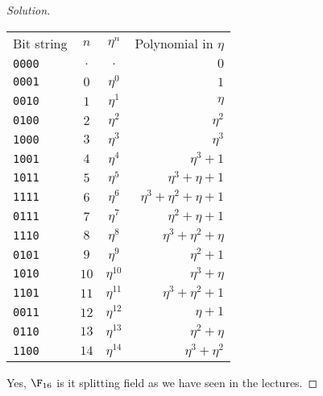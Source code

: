 \begin{proof}[Solution]
\begin{table}
\begin{tabular}{l|c|c|r}
Bit string & $n$ & $\eta^n$ & Polynomial in $\eta$\\
\texttt{0000} & $ .$ & $.        $ & $0$\\
\texttt{0001} & $ 0$ & $\eta^{ 0}$ & $1$\\
\texttt{0010} & $ 1$ & $\eta^{ 1}$ & $\eta$\\ 
\texttt{0100} & $ 2$ & $\eta^{ 2}$ & $\eta^2$\\
\texttt{1000} & $ 3$ & $\eta^{ 3}$ & $\eta^3$\\
\texttt{1001} & $ 4$ & $\eta^{ 4}$ & $\eta^3 + 1$\\
\texttt{1011} & $ 5$ & $\eta^{ 5}$ & $\eta^3 + \eta + 1$\\
\texttt{1111} & $ 6$ & $\eta^{ 6}$ & $\eta^3 + \eta^2 + \eta + 1$\\
\texttt{0111} & $ 7$ & $\eta^{ 7}$ & $\eta^2 + \eta + 1$\\
\texttt{1110} & $ 8$ & $\eta^{ 8}$ & $\eta^3 + \eta^2 + \eta$\\
\texttt{0101} & $ 9$ & $\eta^{ 9}$ & $\eta^2 + 1$\\
\texttt{1010} & $10$ & $\eta^{10}$ & $\eta^3 + \eta$\\
\texttt{1101} & $11$ & $\eta^{11}$ & $\eta^3 + \eta^2 + 1$\\
\texttt{0011} & $12$ & $\eta^{12}$ & $\eta + 1$\\
\texttt{0110} & $13$ & $\eta^{13}$ & $\eta^2 + \eta$\\
\texttt{1100} & $14$ & $\eta^{14}$ & $\eta^3 + \eta^2$
\end{tabular}
\end{table}

{\color{blue}Yes, $\F_{16}$ is it splitting field as we have seen in the lectures.}


\end{proof}
